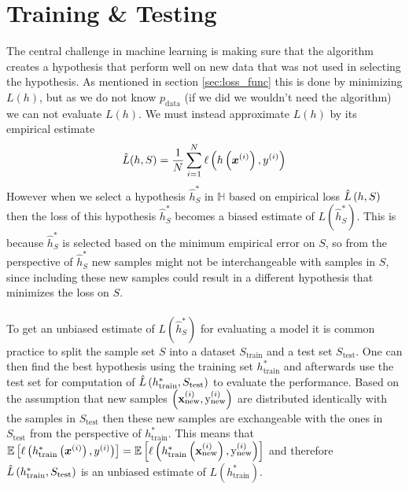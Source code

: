 \section{Training \& Testing} \label{sec:train_val}
The central challenge in machine learning is making sure that the algorithm creates a hypothesis that perform well on new data that was not used in selecting the hypothesis. As mentioned in section \ref{sec:loss_func} this is done by minimizing $L(h)$, but as we do not know $p_\text{data}$ (if we did we wouldn't need the algorithm) we can not evaluate $L(h)$. We must instead approximate $L(h)$ by its empirical estimate 
\begin{equation*}
    \hat{L}(h,S)= \frac{1}{N} \sum_{i=1}^N \ell \left (h\left (\boldsymbol{x}^{(i)}\right), y^{(i)}\right)
\end{equation*}
However when we select a hypothesis $\hat{h}^*_S$ in $\mathbb{H}$ based on empirical loss $\hat{L} \left (h, S\right)$ then the loss of this hypothesis $\hat{h}^*_S$ becomes a biased estimate of $L(\hat{h}^*_S)$. This is because $\hat{h}^*_S$ is selected based on the minimum empirical error on $S$, so from the perspective of $\hat{h}^*_S$ new samples might not be interchangeable with samples in $S$, since including these new samples could result in a different hypothesis that minimizes the loss on $S$. \\
\\
To get an unbiased estimate of $L(\hat{h}^*_S)$ for evaluating a model it is common practice to split the sample set $S$ into a dataset $S_\text{train}$ and a test set $S_\text{test}$. One can then find the best hypothesis using the training set $h^*_\text{train}$ and afterwards use the test set for computation of $\hat{L}\left (h^*_\text{train}, S_\text{test}\right)$ to evaluate the performance. Based on the assumption that new samples $\left (\mathbf{x}^{(i)}_{\text{new}}, \text{y}^{(i)}_{\text{new}}\right)$ are distributed identically with the samples in $S_\text{test}$ then these new samples are exchangeable with the ones in $S_\text{test}$ from the perspective of $h^*_\text{train}$. This means that $\E \lrs{\ell \lr{h^*_\text{train} \lr{\boldsymbol{x}^{(i)}}, y^{(i)}}} = \E \lrs{\ell \lr{h^*_\text{train} \lr{\mathbf{x}^{(i)}_{\text{new}}}, \text{y}_{\text{new}}^{(i)}}}$ and therefore $\hat{L}\left (h^*_\text{train}, S_\text{test}\right)$ is an unbiased estimate of $L(h^*_\text{train})$.

